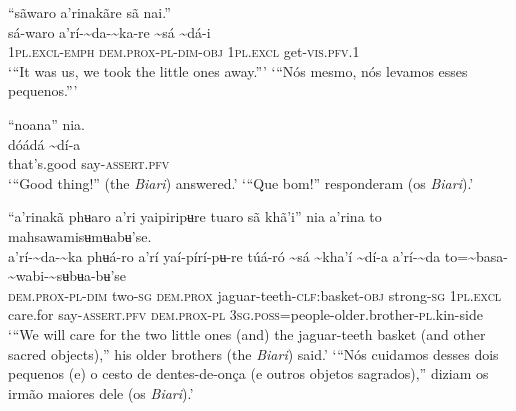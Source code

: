 \documentclass[output=paper,
modfonts,nonflat
]{langsci/langscibook}
\begin{document}
\ea “sãwaro a’rinakãre sã nai.” \\[.3em]
\gll {\textasciitilde}sá-waro	a’rí-{\textasciitilde}da-{\textasciitilde}ka-re	{\textasciitilde}sá	{\textasciitilde}dá-i \\
     1\textsc{pl.excl-emph}	\textsc{dem.prox-pl-dim-obj}	1\textsc{pl.excl}	get-\textsc{vis.pfv.}1\\
\glt ‘“It was us, we took the little ones away.”’
\glt ‘“Nós mesmo, nós levamos esses pequenos.”’
\z 

\newpage 
\ea “noana” nia. \\[.3em]
\gll {\textasciitilde}dóádá	{\textasciitilde}dí-a \\
     that's.good	say-\textsc{assert.pfv}\\
\glt ‘“Good thing!” (the \textit{Biari}) answered.’
\glt ‘“Que bom!” responderam (os \textit{Biari}).’
\z 

\ea “a’rinakã phʉaro a’ri yaipiripʉre tuaro sã khã'i” nia a’rina to mahsawamisʉmʉabʉ'se. \\[.3em]
\gll a’rí-{\textasciitilde}da-{\textasciitilde}ka	phʉá-ro	a’rí	yaí-pírí-pʉ-re	túá-ró	{\textasciitilde}sá {\textasciitilde}kha'í	{\textasciitilde}dí-a	a’rí-{\textasciitilde}da	to={\textasciitilde}basa-{\textasciitilde}wabi-{\textasciitilde}sʉbʉa-bʉ'se{\footnotemark}\\
     \textsc{dem.prox-pl-dim}	two\textsc{-sg}	\textsc{dem.prox}	jaguar-teeth-\textsc{clf:}basket\textsc{-obj}	strong\textsc{-sg}	1\textsc{pl.excl} care.for	say-\textsc{assert.pfv}	\textsc{dem.prox-pl}	3\textsc{sg.poss}=people-older.brother-\textsc{pl}.kin-side\\
\glt ‘“We will care for the two little ones (and) the jaguar-teeth basket (and other sacred objects),” his older brothers (the \textit{Biari}) said.’
\glt ‘“Nós cuidamos desses dois pequenos (e) o cesto de dentes-de-onça (e outros objetos sagrados),” diziam os irmão maiores dele (os \textit{Biari}).’
\z
\end{document}
